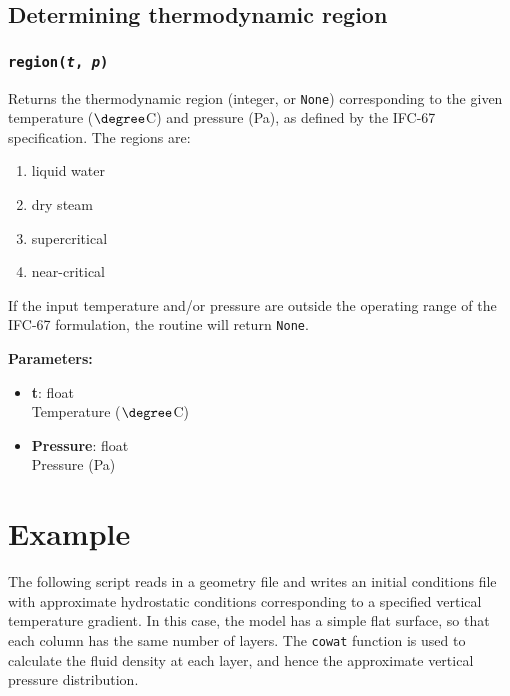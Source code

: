 \subsection{Determining thermodynamic region}

\begin{snugshade}
\subsubsection{\texttt{region(\emph{t}, \emph{p})}}
\end{snugshade}
\label{sec:t2thermo:region}

Returns the thermodynamic region (integer, or \texttt{None}) corresponding to the given temperature ($\degree$C) and pressure (Pa), as defined by the IFC-67 specification. The regions are:

\begin{enumerate}
  \item liquid water
  \item dry steam
  \item supercritical
  \item near-critical
\end{enumerate}

If the input temperature and/or pressure are outside the operating range of the IFC-67 formulation, the routine will return \texttt{None}.

\textbf{Parameters:}
\begin{itemize}
\item \textbf{t}: float\\
  Temperature ($\degree$C)
\item \textbf{Pressure}: float\\
  Pressure (Pa)
\end{itemize}

\section{Example}

The following script reads in a geometry file and writes an initial conditions file with approximate hydrostatic conditions corresponding to a specified vertical temperature gradient.  In this case, the model has a simple flat surface, so that each column has the same number of layers.  The \texttt{cowat} function is used to calculate the fluid density at each layer, and hence the approximate vertical pressure distribution.

